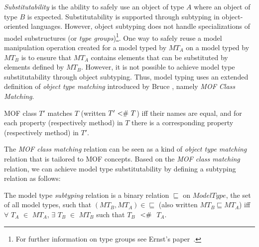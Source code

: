 {\em Substitutability} is the ability to safely use an object of type $A$ where an object of type $B$ is expected. 
Substitutability is supported through subtyping in object-oriented languages. However, object subtyping does not handle specializations of model substructures (or {\em type groups})\footnote{For further information on type groups see Ernst's paper~\cite{Ernst01}.}. 
One way to safely reuse a model manipulation operation created for a model typed by $MT_A$ on a model typed by $MT_B$ is to ensure that $MT_A$ contains elements that can be substituted by elements defined by $MT_B$. 
However, it is not possible to achieve model type substitutability through object subtyping. Thus, model typing uses an extended definition of \emph{object type matching} introduced by Bruce \etal \cite{Bruce03}, namely \emph{MOF Class Matching}.

\begin{definition}
MOF class $T'$ matches $T$ (written $T' \mbox{~<\#~} T$) iff their names are equal, and for each property (respectively method) in $T$ there is a corresponding property (respectively method) in $T'$.
\end{definition}

The \emph{MOF class matching} relation can be seen as a kind of \emph{object type matching} relation that is tailored to MOF concepts.
Based on the \emph{MOF class matching} relation, we can achieve model type substitutability by defining a subtyping relation as follows:

\begin{definition}
The model type \emph{subtyping} relation is a binary relation $\sqsubseteq$ on $ModelType$, the set of all model types, such that $(MT_B, MT_A) \in \sqsubseteq$ (also written $MT_B \sqsubseteq MT_A$) iff  $\forall$ $T_A$ $\in$ $MT_A$, $\exists$ $T_B$ $\in$ $MT_B$ such that $T_B$ $\mbox{~<\#~}$ $T_A$.
\end{definition}

